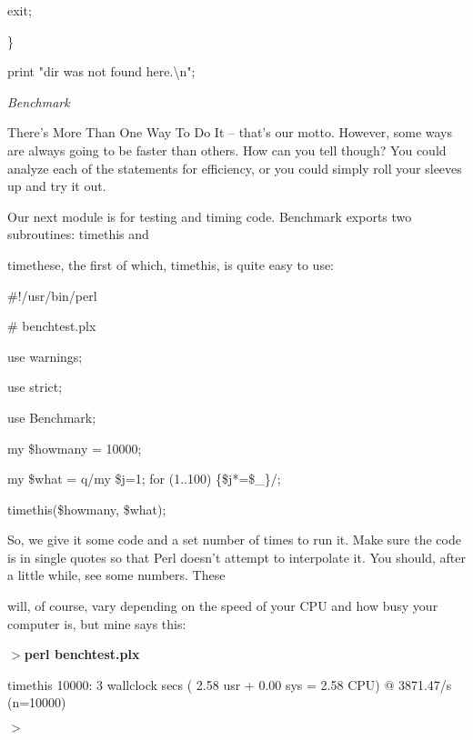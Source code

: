 \documentclass[a4paper,11pt]{book}
\begin{document}
\noindent exit;

\noindent \}

\noindent print "dir was not found here.\textbackslash n";

\noindent 

\noindent \textit{Benchmark}

\noindent There's More Than One Way To Do It -- that's our motto. However, some ways are always going to be faster than others. How can you tell though? You could analyze each of the statements for efficiency, or you could simply roll your sleeves up and try it out.

\noindent 

\noindent 

\noindent Our next module is for testing and timing code. Benchmark exports two subroutines: timethis and

\noindent timethese, the first of which, timethis, is quite easy to use:

\noindent 

\noindent \#!/usr/bin/perl

\noindent \# benchtest.plx

\noindent use warnings;

\noindent use strict;

\noindent 

\noindent use Benchmark;

\noindent my \$howmany = 10000;

\noindent my \$what = q/my \$j=1; for (1..100) \{\$j*=\$\_\}/;

\noindent 

\noindent timethis(\$howmany, \$what);

\noindent 

\noindent So, we give it some code and a set number of times to run it. Make sure the code is in single quotes so that Perl doesn't attempt to interpolate it. You should, after a little while, see some numbers. These

\noindent will, of course, vary depending on the speed of your CPU and how busy your computer is, but mine says this:

\noindent 

\noindent $>$\textbf{perl benchtest.plx}

\noindent timethis 10000:  3 wallclock secs ( 2.58 usr +  0.00 sys =  2.58 CPU) @ 3871.47/s (n=10000)

\noindent $>$

\noindent 
\end{document}
